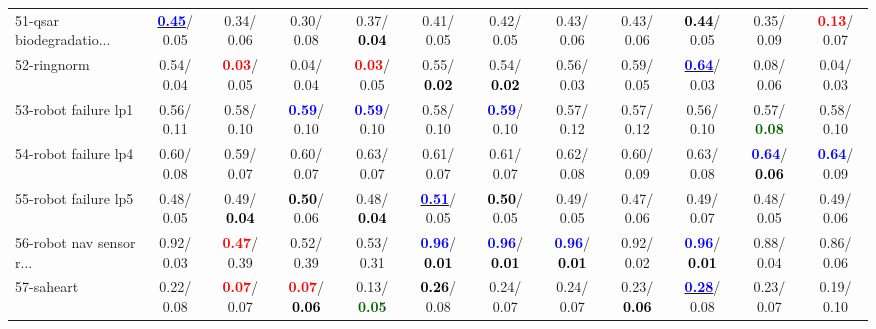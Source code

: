 \begin{table}[h]
\begin{center}
{\begin{tabular}{lc|c|c|c|c|c|c|c|c|c|c}
51-qsar biodegradatio... & \underline{\textcolor{blue}{\textbf{  0.45}}}/  0.05 &   0.34/  0.06 &   0.30/  0.08 &   0.37/\textcolor{black}{\textbf{  0.04}} &   0.41/  0.05 &   0.42/  0.05 &   0.43/  0.06 &   0.43/  0.06 & \textcolor{black}{\textbf{  0.44}}/  0.05 &   0.35/  0.09 & \textcolor{red}{\textbf{  0.13}}/  0.07 \\
52-ringnorm &   0.54/  0.04 & \textcolor{red}{\textbf{  0.03}}/  0.05 &   0.04/  0.04 & \textcolor{red}{\textbf{  0.03}}/  0.05 &   0.55/\textcolor{black}{\textbf{  0.02}} &   0.54/\textcolor{black}{\textbf{  0.02}} &   0.56/  0.03 &   0.59/  0.05 & \underline{\textcolor{blue}{\textbf{  0.64}}}/  0.03 &   0.08/  0.06 &   0.04/  0.03 \\
53-robot failure lp1 &   0.56/  0.11 &   0.58/  0.10 & \textcolor{blue}{\textbf{  0.59}}/  0.10 & \textcolor{blue}{\textbf{  0.59}}/  0.10 &   0.58/  0.10 & \textcolor{blue}{\textbf{  0.59}}/  0.10 &   0.57/  0.12 &   0.57/  0.12 &   0.56/  0.10 &   0.57/\textcolor{darkgreen}{\textbf{  0.08}} &   0.58/  0.10 \\ \hline
54-robot failure lp4 &   0.60/  0.08 &   0.59/  0.07 &   0.60/  0.07 &   0.63/  0.07 &   0.61/  0.07 &   0.61/  0.07 &   0.62/  0.08 &   0.60/  0.09 &   0.63/  0.08 & \textcolor{blue}{\textbf{  0.64}}/\textcolor{black}{\textbf{  0.06}} & \textcolor{blue}{\textbf{  0.64}}/  0.09 \\
55-robot failure lp5 &   0.48/  0.05 &   0.49/\textcolor{black}{\textbf{  0.04}} & \textcolor{black}{\textbf{  0.50}}/  0.06 &   0.48/\textcolor{black}{\textbf{  0.04}} & \underline{\textcolor{blue}{\textbf{  0.51}}}/  0.05 & \textcolor{black}{\textbf{  0.50}}/  0.05 &   0.49/  0.05 &   0.47/  0.06 &   0.49/  0.07 &   0.48/  0.05 &   0.49/  0.06 \\
56-robot nav sensor r... &   0.92/  0.03 & \textcolor{red}{\textbf{  0.47}}/  0.39 &   0.52/  0.39 &   0.53/  0.31 & \textcolor{blue}{\textbf{  0.96}}/\textcolor{black}{\textbf{  0.01}} & \textcolor{blue}{\textbf{  0.96}}/\textcolor{black}{\textbf{  0.01}} & \textcolor{blue}{\textbf{  0.96}}/\textcolor{black}{\textbf{  0.01}} &   0.92/  0.02 & \textcolor{blue}{\textbf{  0.96}}/\textcolor{black}{\textbf{  0.01}} &   0.88/  0.04 &   0.86/  0.06 \\
57-saheart &   0.22/  0.08 & \textcolor{red}{\textbf{  0.07}}/  0.07 & \textcolor{red}{\textbf{  0.07}}/\textcolor{black}{\textbf{  0.06}} &   0.13/\textcolor{darkgreen}{\textbf{  0.05}} & \textcolor{black}{\textbf{  0.26}}/  0.08 &   0.24/  0.07 &   0.24/  0.07 &   0.23/\textcolor{black}{\textbf{  0.06}} & \underline{\textcolor{blue}{\textbf{  0.28}}}/  0.08 &   0.23/  0.07 &   0.19/  0.10 \\

\end{tabular}}
\end{center}
\end{table}
